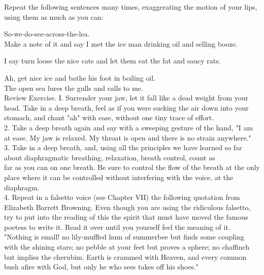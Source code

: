 \documentclass[10pt]{article}
\begin{document}
Repeat the following sentences many times, exaggerating the motion of your lips, using them as much as you can:

So-we-do-see-across-the-lea.\\
Make a note of it and say I met the ice man drinking oil and selling booze.

I say turn loose the nice cats and let them eat the fat and saucy rats.

Ah, get nice ice and bathe his foot in boiling oil.\\
The open sea lures the gulls and calls to me.\\
Review Exercise. I. Surrender your jaw, let it fall like a dead weight from your head. Take in a deep breath, feel as if you were sucking the air down into your stomach, and chant "ah" with ease, without one tiny trace of effort.\\
2. Take a deep breath again and say with a sweeping gesture of the hand, "I am at ease. My jaw is relaxed. My throat is open and there is no strain anywhere."\\
3. Take in a deep breath, and, using all the principles we have learned so far about diaphragmatic breathing, relaxation, breath control, count as\\
far as you can on one breath. Be sure to control the flow of the breath at the only place where it can be controlled without interfering with the voice, at the diaphragm.\\
4. Repeat in a falsetto voice (see Chapter VII) the following quotation from Elizabeth Barrett Browning. Even though you are using the ridiculous falsetto, try to put into the reading of this the spirit that must have moved the famous poetess to write it. Read it over until you yourself feel the meaning of it.\\
"Nothing is small! no lily-muffled hum of summerbee but finds some coupling with the shining stars; no pebble at your feet but proves a sphere; no chaffinch but implies the cherubim. Earth is crammed with Heaven, and every common bush afire with God, but only he who sees takes off his shoes."
\end{document}
